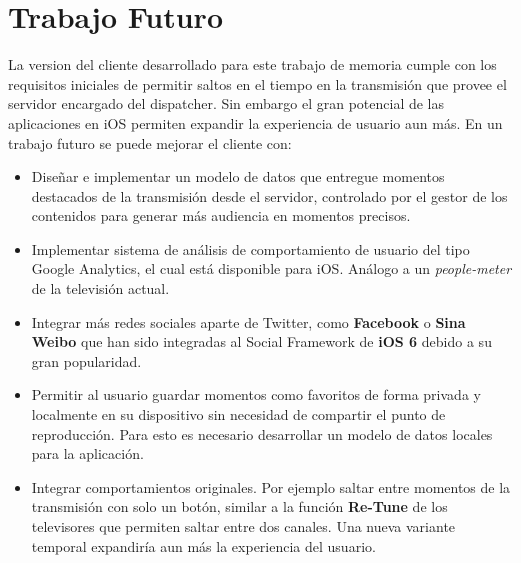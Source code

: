 	\section{Trabajo Futuro}
La version del cliente desarrollado para este trabajo de memoria cumple con los requisitos iniciales de permitir saltos en el tiempo en la transmisión que provee el servidor encargado del dispatcher. Sin embargo el gran potencial de las aplicaciones en iOS permiten expandir la experiencia de usuario aun más. En un trabajo futuro se puede mejorar el cliente con:
\begin{itemize}
\item Diseñar e implementar un modelo de datos que entregue momentos destacados de la transmisión desde el servidor, controlado por el gestor de los contenidos para generar más audiencia en momentos precisos.

\item Implementar sistema de análisis de comportamiento de usuario del tipo Google Analytics, el cual está disponible para iOS. Análogo a un \textit{people-meter} de la televisión actual.

\item Integrar más redes sociales aparte de Twitter, como \textbf{Facebook} o \textbf{Sina Weibo} que han sido integradas al Social Framework de \textbf{iOS 6} debido a su gran popularidad.

\item Permitir al usuario guardar momentos como favoritos de forma privada y localmente en su dispositivo sin necesidad de compartir el punto de reproducción. Para esto es necesario desarrollar un modelo de datos locales para la aplicación.

\item Integrar comportamientos originales. Por ejemplo saltar entre momentos de la transmisión con solo un botón, similar a la función \textbf{Re-Tune} de los televisores que permiten saltar entre dos canales. Una nueva variante temporal expandiría aun más la experiencia del usuario.
\end{itemize}

	
